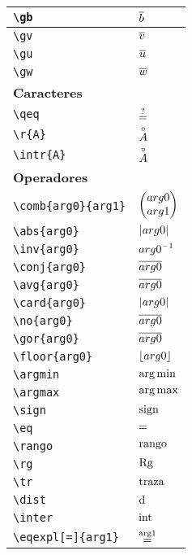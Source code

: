 \begin{longtable}{|p{3.5cm}|p{2cm}|}
\verb|\gb| & $\displaystyle\overline{b}$ \\ \midrule 
\verb|\gv| & $\displaystyle\overline{v}$ \\ \midrule 
\verb|\gu| & $\displaystyle\overline{u}$ \\ \midrule 
\verb|\gw| & $\displaystyle\overline{w}$ \\ \midrule 
\bottomrule \multicolumn{2}{|p{5.5cm}|}{\textbf{Caracteres}} \\ \toprule 
\verb|\qeq| & $\displaystyle\overset{?}{=}$ \\ \midrule 
\verb|\r{A}| & $\displaystyle\overset{\circ}{A}$ \\ \midrule 
\verb|\intr{A}| & $\displaystyle\overset{\circ}{A}$ \\ \midrule 
\bottomrule \multicolumn{2}{|p{5.5cm}|}{\textbf{Operadores}} \\ \toprule 
\verb|\comb{arg0}{arg1}| & $\displaystyle\left( \begin{matrix} arg0 \\ arg1 \end{matrix} \right)$ \\ \midrule 
\verb|\abs{arg0}| & $\displaystyle\left\vert arg0 \right\vert$ \\ \midrule 
\verb|\inv{arg0}| & $\displaystyle{arg0}^{-1}$ \\ \midrule 
\verb|\conj{arg0}| & $\displaystyle\overline{arg0}$ \\ \midrule 
\verb|\avg{arg0}| & $\displaystyle\overline{arg0}$ \\ \midrule 
\verb|\card{arg0}| & $\displaystyle\left\vert arg0 \right\vert$ \\ \midrule 
\verb|\no{arg0}| & $\displaystyle\overline{arg0}$ \\ \midrule 
\verb|\gor{arg0}| & $\displaystyle\overline{arg0}$ \\ \midrule 
\verb|\floor{arg0}| & $\displaystyle\left\lfloor arg0 \right\rfloor$ \\ \midrule 
\verb|\argmin| & $\displaystyle\operatorname*{arg\,min}$ \\ \midrule 
\verb|\argmax| & $\displaystyle\operatorname*{arg\,max}$ \\ \midrule 
\verb|\sign| & $\displaystyle\operatorname{sign}$ \\ \midrule 
\verb|\eq| & $\displaystyle=$ \\ \midrule 
\verb|\rango| & $\displaystyle\operatorname{rango}$ \\ \midrule 
\verb|\rg| & $\displaystyle\operatorname{Rg}$ \\ \midrule 
\verb|\tr| & $\displaystyle\operatorname{traza}$ \\ \midrule 
\verb|\dist| & $\displaystyle\operatorname{d}$ \\ \midrule 
\verb|\inter| & $\displaystyle\operatorname{int}$ \\ \midrule 
\verb|\eqexpl[=]{arg1}| & $\displaystyle\eqexpl[=]{arg1}$ \\ \midrule 

\end{longtable}
